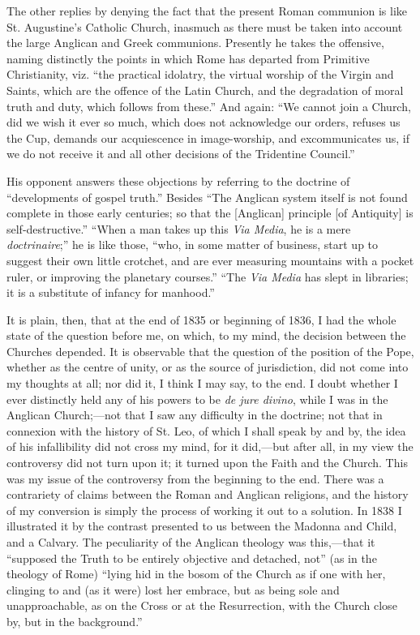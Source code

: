 The other replies by denying the fact that the present Roman
communion is like St. Augustine's Catholic Church, inasmuch as there
must be taken into account the large Anglican and Greek
communions. Presently he takes the offensive, naming distinctly the
points in which Rome has departed from Primitive Christianity, viz.
``the practical idolatry, the virtual worship of the Virgin and
Saints, which are the offence of the Latin Church, and the degradation
of moral truth and duty, which follows from these.'' And again:
``We cannot join a Church, did we wish it ever so much, which does
not acknowledge our orders, refuses us the Cup, demands our acquiescence
in image-worship, and excommunicates us, if we do not receive it
and all other decisions of the Tridentine Council.''

His opponent answers these objections by referring to the doctrine of
``developments of gospel truth.'' Besides ``The Anglican
system itself is not found complete in those early centuries; so that
the [Anglican] principle [of Antiquity] is
self-destructive.'' ``When a man takes up this \emph{Via Media},
he is a mere \emph{doctrinaire};'' he is like those, ``who, in some matter of
business, start up to suggest their own little crotchet, and are ever
measuring mountains with a pocket ruler, or improving the planetary
courses.'' ``The \emph{Via Media} has slept in libraries; it is
a substitute of infancy for manhood.''

It is plain, then, that at the end of 1835 or beginning of 1836, I
had the whole state of the question before me, on which, to my mind, the
decision between the Churches depended. It is observable that the
question of the position of the Pope, whether as the centre of unity, or
as the source of jurisdiction, did not come into my thoughts at all; nor
did it, I think I may say, to the end. I doubt whether I ever distinctly
held any of his powers to be \emph{de jure divino}, while I was in the
Anglican Church;—not that I saw any difficulty in the doctrine; not
that in connexion with the history of St. Leo, of which I shall
speak by and by, the idea of his infallibility did not cross my mind,
for it did,—but after all, in my view the controversy did not turn upon
it; it turned upon the Faith and the Church. This was my issue of the
controversy from the beginning to the end. There was a contrariety of
claims between the Roman and Anglican religions, and the history of my
conversion is simply the process of working it out to a solution. In
1838 I illustrated it by the contrast presented to us between the
Madonna and Child, and a Calvary. The peculiarity of the
Anglican theology was this,—that it ``supposed the Truth to be
entirely objective and detached, not'' (as in the theology of Rome)
``lying hid in the bosom of the Church as if one with her, clinging
to and (as it were) lost her embrace, but as being sole and
unapproachable, as on the Cross or at the Resurrection, with the
Church close by, but in the background.''

